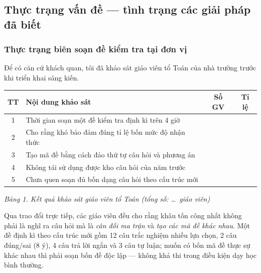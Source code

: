 \subsection{Thực trạng vấn đề --- tình trạng các giải pháp đã biết}

\subsubsection{Thực trạng biên soạn đề kiểm tra tại đơn vị}

Để có căn cứ khách quan, tôi đã khảo sát giáo viên tổ Toán của nhà trường
trước khi triển khai sáng kiến.

\begin{center}
\begin{tabular}{|c|p{8.2cm}|c|c|}
\hline
\textbf{TT} & \textbf{Nội dung khảo sát} & \textbf{Số GV} & \textbf{Tỉ lệ} \\ \hline
1 & Thời gian soạn một đề kiểm tra định kì trên 4 giờ & & \\ \hline
2 & Cho rằng khó bảo đảm đúng tỉ lệ bốn mức độ nhận thức & & \\ \hline
3 & Tạo mã đề bằng cách đảo thứ tự câu hỏi và phương án & & \\ \hline
4 & Không tái sử dụng được kho câu hỏi của năm trước & & \\ \hline
5 & Chưa quen soạn đủ bốn dạng câu hỏi theo cấu trúc mới & & \\ \hline
\end{tabular}
\end{center}
\textit{Bảng 1. Kết quả khảo sát giáo viên tổ Toán (tổng số: \dots\ giáo viên)}


Qua trao đổi trực tiếp, các giáo viên đều cho rằng khâu tốn công nhất không
phải là nghĩ ra câu hỏi mà là \textit{cân đối ma trận} và \textit{tạo các mã đề
khác nhau}. Một đề định kì theo cấu trúc mới gồm 12 câu trắc nghiệm nhiều lựa
chọn, 2 câu đúng/sai (8 ý), 4 câu trả lời ngắn và 3 câu tự luận; muốn có bốn mã
đề thực sự khác nhau thì phải soạn bốn đề độc lập --- không khả thi trong điều
kiện dạy học bình thường.

